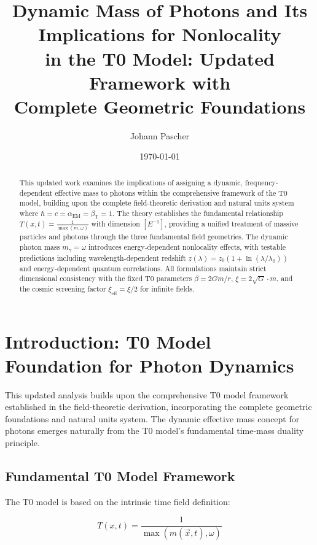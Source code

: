 \documentclass[12pt,a4paper]{article}
\title{Dynamic Mass of Photons and Its Implications for Nonlocality \\ in the T0 Model: Updated Framework with \\ Complete Geometric Foundations}
\author{Johann Pascher}
\date{\today}
\newcommand{\Tfield}{T(x,t)}
\begin{document}
	
	\maketitle
	
	\begin{abstract}
		This updated work examines the implications of assigning a dynamic, frequency-dependent effective mass to photons within the comprehensive framework of the T0 model, building upon the complete field-theoretic derivation and natural units system where $\hbar = c = \alpha_{\text{EM}} = \beta_{\text{T}} = 1$. The theory establishes the fundamental relationship $\Tfield = \frac{1}{\max(m, \omega)}$ with dimension $[E^{-1}]$, providing a unified treatment of massive particles and photons through the three fundamental field geometries. The dynamic photon mass $m_\gamma = \omega$ introduces energy-dependent nonlocality effects, with testable predictions including wavelength-dependent redshift $z(\lambda) = z_0(1 + \ln(\lambda/\lambda_0))$ and energy-dependent quantum correlations. All formulations maintain strict dimensional consistency with the fixed T0 parameters $\beta = 2Gm/r$, $\xi = 2\sqrt{G} \cdot m$, and the cosmic screening factor $\xi_{\text{eff}} = \xi/2$ for infinite fields.
	\end{abstract}
	
	\tableofcontents
	\newpage
	
	\section{Introduction: T0 Model Foundation for Photon Dynamics}
	
	This updated analysis builds upon the comprehensive T0 model framework established in the field-theoretic derivation, incorporating the complete geometric foundations and natural units system. The dynamic effective mass concept for photons emerges naturally from the T0 model's fundamental time-mass duality principle.
	
	\subsection{Fundamental T0 Model Framework}
	
	The T0 model is based on the intrinsic time field definition:
	
	\begin{equation}
		\boxed{\Tfield = \frac{1}{\max(m(\vec{x},t), \omega)}}
		\label{eq:intrinsic_time_field}
	\end{equation}
	
\end{document}
